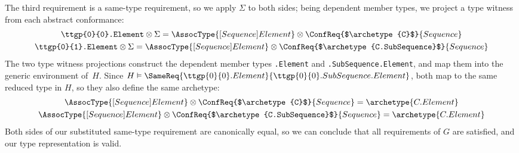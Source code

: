 \documentclass[../generics]{subfiles}
\begin{document}
\begin{example}
The third requirement is a same-type requirement, so we apply $\Sigma$ to both sides; being dependent member types, we project a type witness from each abstract conformance:
\begin{gather*}
\texttt{\ttgp{0}{0}.Element}\otimes\Sigma=\AssocType{[Sequence]Element}\otimes\ConfReq{$\archetype{C}$}{Sequence}\\
\texttt{\ttgp{0}{1}.Element}\otimes\Sigma=\AssocType{[Sequence]Element}\otimes\ConfReq{$\archetype{C.SubSequence}$}{Sequence}
\end{gather*}
The two type witness projections construct the dependent member types \texttt{.Element} and \texttt{.SubSequence.Element}, and map them into the generic environment of~$H$. Since $H\vDash\SameReq{\ttgp{0}{0}.Element}{\ttgp{0}{0}.SubSequence.Element}$, both map to the same reduced type in $H$, so they also define the same archetype:
\begin{gather*}
\AssocType{[Sequence]Element}\otimes\ConfReq{$\archetype{C}$}{Sequence}=\archetype{C.Element}\\
\AssocType{[Sequence]Element}\otimes\ConfReq{$\archetype{C.SubSequence}$}{Sequence}=\archetype{C.Element}
\end{gather*}
Both sides of our substituted same-type requirement are canonically equal, so we can conclude that all requirements of $G$ are satisfied, and our type representation is valid.
\end{example}
\end{document}
